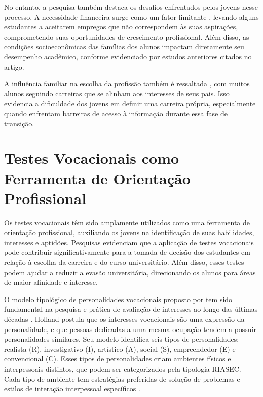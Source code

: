 No entanto, a pesquisa também destaca os desafios enfrentados pelos jovens nesse processo. A necessidade financeira surge como um fator limitante \cite{lopes2022fim}, levando alguns estudantes a aceitarem empregos que não correspondem às suas aspirações, comprometendo suas oportunidades de crescimento profissional. Além disso, as condições socioeconômicas das famílias dos alunos impactam diretamente seu desempenho acadêmico, conforme evidenciado por estudos anteriores citados no artigo.

A influência familiar na escolha da profissão também é ressaltada \cite{lopes2022fim}, com muitos alunos seguindo carreiras que se alinham aos interesses de seus pais. Isso evidencia a dificuldade dos jovens em definir uma carreira própria, especialmente quando enfrentam barreiras de acesso à informação durante essa fase de transição.


\section{Testes Vocacionais como Ferramenta de Orientação Profissional}

Os testes vocacionais têm sido amplamente utilizados como uma ferramenta de orientação profissional, auxiliando os jovens na identificação de suas habilidades, interesses e aptidões. Pesquisas evidenciam que a aplicação de testes vocacionais pode contribuir significativamente para a tomada de decisão dos estudantes em relação à escolha da carreira e do curso universitário. Além disso, esses testes podem ajudar a reduzir a evasão universitária, direcionando os alunos para áreas de maior afinidade e interesse.

O modelo tipológico de personalidades vocacionais proposto por \cite{holland1997making} tem sido fundamental na pesquisa e prática de avaliação de interesses ao longo das últimas décadas \cite{de2006relaccao}. Holland postula que os interesses vocacionais são uma expressão da personalidade, e que pessoas dedicadas a uma mesma ocupação tendem a possuir personalidades similares. Seu modelo identifica seis tipos de personalidades: realista (R), investigativo (I), artístico (A), social (S), empreendedor (E) e convencional (C). Esses tipos de personalidades criam ambientes físicos e interpessoais distintos, que podem ser categorizados pela tipologia RIASEC. Cada tipo de ambiente tem estratégias preferidas de solução de problemas e estilos de interação interpessoal específicos \cite{holland1997making}. 

